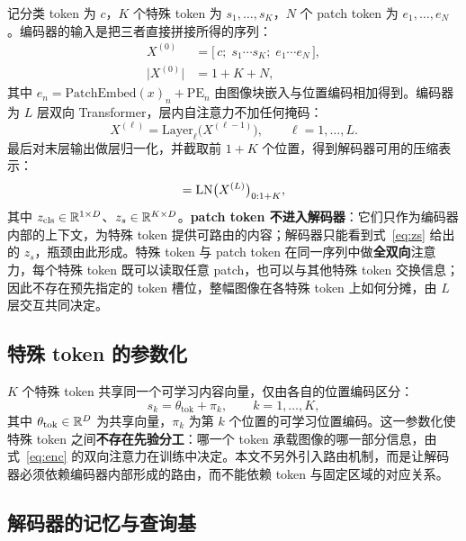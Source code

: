 记分类 token 为 $c$，$K$ 个特殊 token 为 $s_1,\dots,s_K$，$N$ 个 patch token 为 $e_1,\dots,e_N$。编码器的输入是把三者直接拼接所得的序列：
\begin{equation}
\begin{aligned}
X^{(0)}&=\big[\,c;\;s_1\cdots s_K;\;e_1\cdots e_N\,\big],\\
\big|X^{(0)}\big|&=1+K+N,
\end{aligned}
\label{eq:input}
\end{equation}
其中 $e_n=\mathrm{PatchEmbed}(x)_n+\mathrm{PE}_n$ 由图像块嵌入与位置编码相加得到。编码器为 $L$ 层双向 Transformer，层内自注意力不加任何掩码：
\begin{equation}
X^{(\ell)}=\mathrm{Layer}_{\ell}\big(X^{(\ell-1)}\big),\qquad \ell=1,\dots,L.
\label{eq:enc}
\end{equation}
最后对末层输出做层归一化，并截取前 $1+K$ 个位置，得到解码器可用的压缩表示：
\begin{equation}
[\,z_{\mathrm{cls}};\;z_s\,]=\LN\big(X^{(L)}\big)_{0:1+K},
\label{eq:zs}
\end{equation}
其中 $z_{\mathrm{cls}}\in\mathbb{R}^{1\times D}$、$z_s\in\mathbb{R}^{K\times D}$。\textbf{patch token 不进入解码器}：它们只作为编码器内部的上下文，为特殊 token 提供可路由的内容；解码器只能看到式~\eqref{eq:zs} 给出的 $z_s$，瓶颈由此形成。特殊 token 与 patch token 在同一序列中做\textbf{全双向}注意力，每个特殊 token 既可以读取任意 patch，也可以与其他特殊 token 交换信息；因此不存在预先指定的 token 槽位，整幅图像在各特殊 token 上如何分摊，由 $L$ 层交互共同决定。

\subsection{\heiti 特殊 token 的参数化}
\label{sec:special}

$K$ 个特殊 token 共享同一个可学习内容向量，仅由各自的位置编码区分：
\begin{equation}
s_k=\theta_{\mathrm{tok}}+\pi_k,\qquad k=1,\dots,K,
\label{eq:special}
\end{equation}
其中 $\theta_{\mathrm{tok}}\in\mathbb{R}^{D}$ 为共享向量，$\pi_k$ 为第 $k$ 个位置的可学习位置编码。这一参数化使特殊 token 之间\textbf{不存在先验分工}：哪一个 token 承载图像的哪一部分信息，由式~\eqref{eq:enc} 的双向注意力在训练中决定。本文不另外引入路由机制，而是让解码器必须依赖编码器内部形成的路由，而不能依赖 token 与固定区域的对应关系。

\subsection{\heiti 解码器的记忆与查询基}
\label{sec:memory}

